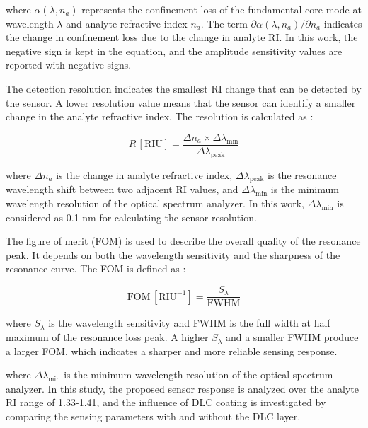 \documentclass[preprint,12pt]{elsarticle}
\begin{document}
where $\alpha(\lambda,n_a)$ represents the confinement loss of the fundamental core mode at wavelength $\lambda$ and analyte refractive index $n_a$. The term $\partial\alpha(\lambda,n_a)/\partial n_a$ indicates the change in confinement loss due to the change in analyte RI. In this work, the negative sign is kept in the equation, and the amplitude sensitivity values are reported with negative signs.

The detection resolution indicates the smallest RI change that can be detected by the sensor. A lower resolution value means that the sensor can identify a smaller change in the analyte refractive index. The resolution is calculated as \cite{ashrafian2025highly}:

\begin{equation}
R\,[\mathrm{RIU}]
=
\frac{\Delta n_a \times \Delta\lambda_{\min}}
{\Delta\lambda_{\mathrm{peak}}}
\label{eq:resolution}
\end{equation}

where $\Delta n_a$ is the change in analyte refractive index, $\Delta\lambda_{\mathrm{peak}}$ is the resonance wavelength shift between two adjacent RI values, and $\Delta\lambda_{\min}$ is the minimum wavelength resolution of the optical spectrum analyzer. In this work, $\Delta\lambda_{\min}$ is considered as 0.1 nm for calculating the sensor resolution.

The figure of merit (FOM) is used to describe the overall quality of the resonance peak. It depends on both the wavelength sensitivity and the sharpness of the resonance curve. The FOM is defined as \cite{ashrafian2025highly}:

\begin{equation}
\mathrm{FOM}\,[\mathrm{RIU}^{-1}]
=
\frac{S_{\lambda}}{\mathrm{FWHM}}
\label{eq:fom}
\end{equation}

where $S_{\lambda}$ is the wavelength sensitivity and FWHM is the full width at half maximum of the resonance loss peak. A higher $S_{\lambda}$ and a smaller FWHM produce a larger FOM, which indicates a sharper and more reliable sensing response.

where $\Delta\lambda_{\mathrm{min}}$ is the minimum wavelength resolution of the optical spectrum analyzer. In this study, the proposed sensor response is analyzed over the analyte RI range of 1.33-1.41, and the influence of DLC coating is investigated by comparing the sensing parameters with and without the DLC layer.
\end{document}
